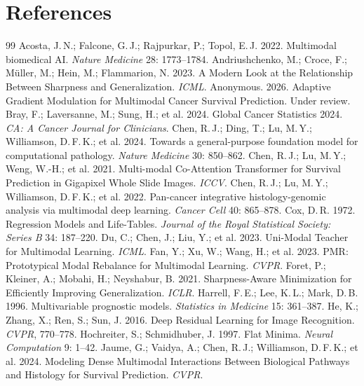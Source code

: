 \documentclass[10pt]{article}\usepackage[utf8]{inputenc}\usepackage[T1]{fontenc}\usepackage{amsmath,amssymb,amsfonts,bm}\usepackage{booktabs}\usepackage{multirow}\usepackage{array}\usepackage{graphicx}\usepackage{algorithm}\usepackage{algorithmic}\usepackage{xcolor}\usepackage[margin=1in]{geometry}\usepackage{microtype}
\begin{document}
\section*{References}
\begin{thebibliography}{99}\small
{} Acosta, J.\,N.; Falcone, G.\,J.; Rajpurkar, P.; Topol, E.\,J. 2022. Multimodal biomedical AI. \emph{Nature Medicine} 28: 1773--1784.
 Andriushchenko, M.; Croce, F.; M{\"u}ller, M.; Hein, M.; Flammarion, N. 2023. A Modern Look at the Relationship Between Sharpness and Generalization. \emph{ICML}.
 Anonymous. 2026. Adaptive Gradient Modulation for Multimodal Cancer Survival Prediction. Under review.
 Bray, F.; Laversanne, M.; Sung, H.; et al. 2024. Global Cancer Statistics 2024. \emph{CA: A Cancer Journal for Clinicians}.
 Chen, R.\,J.; Ding, T.; Lu, M.\,Y.; Williamson, D.\,F.\,K.; et al. 2024. Towards a general-purpose foundation model for computational pathology. \emph{Nature Medicine} 30: 850--862.
 Chen, R.\,J.; Lu, M.\,Y.; Weng, W.-H.; et al. 2021. Multi-modal Co-Attention Transformer for Survival Prediction in Gigapixel Whole Slide Images. \emph{ICCV}.
 Chen, R.\,J.; Lu, M.\,Y.; Williamson, D.\,F.\,K.; et al. 2022. Pan-cancer integrative histology-genomic analysis via multimodal deep learning. \emph{Cancer Cell} 40: 865--878.
 Cox, D.\,R. 1972. Regression Models and Life-Tables. \emph{Journal of the Royal Statistical Society: Series B} 34: 187--220.
 Du, C.; Chen, J.; Liu, Y.; et al. 2023. Uni-Modal Teacher for Multimodal Learning. \emph{ICML}.
 Fan, Y.; Xu, W.; Wang, H.; et al. 2023. PMR: Prototypical Modal Rebalance for Multimodal Learning. \emph{CVPR}.
 Foret, P.; Kleiner, A.; Mobahi, H.; Neyshabur, B. 2021. Sharpness-Aware Minimization for Efficiently Improving Generalization. \emph{ICLR}.
 Harrell, F.\,E.; Lee, K.\,L.; Mark, D.\,B. 1996. Multivariable prognostic models. \emph{Statistics in Medicine} 15: 361--387.
 He, K.; Zhang, X.; Ren, S.; Sun, J. 2016. Deep Residual Learning for Image Recognition. \emph{CVPR}, 770--778.
 Hochreiter, S.; Schmidhuber, J. 1997. Flat Minima. \emph{Neural Computation} 9: 1--42.
 Jaume, G.; Vaidya, A.; Chen, R.\,J.; Williamson, D.\,F.\,K.; et al. 2024. Modeling Dense Multimodal Interactions Between Biological Pathways and Histology for Survival Prediction. \emph{CVPR}.

\end{thebibliography}
\end{document}
